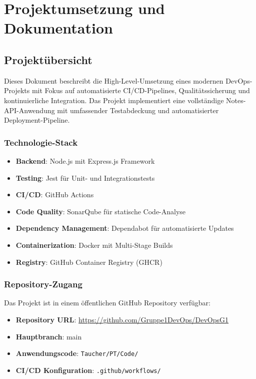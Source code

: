 \section{Projektumsetzung und Dokumentation}

\subsection{Projektübersicht}

Dieses Dokument beschreibt die High-Level-Umsetzung eines modernen DevOps-Projekts mit Fokus auf automatisierte CI/CD-Pipelines, Qualitätssicherung und kontinuierliche Integration. Das Projekt implementiert eine vollständige Notes-API-Anwendung mit umfassender Testabdeckung und automatisierter Deployment-Pipeline.

\subsubsection{Technologie-Stack}
\begin{itemize}
    \item \textbf{Backend}: Node.js mit Express.js Framework
    \item \textbf{Testing}: Jest für Unit- und Integrationstests
    \item \textbf{CI/CD}: GitHub Actions
    \item \textbf{Code Quality}: SonarQube für statische Code-Analyse
    \item \textbf{Dependency Management}: Dependabot für automatisierte Updates
    \item \textbf{Containerization}: Docker mit Multi-Stage Builds
    \item \textbf{Registry}: GitHub Container Registry (GHCR)
\end{itemize}

\subsubsection{Repository-Zugang}
Das Projekt ist in einem öffentlichen GitHub Repository verfügbar:
\begin{itemize}
    \item \textbf{Repository URL}: \url{https://github.com/Gruppe1DevOps/DevOpsG1}
    \item \textbf{Hauptbranch}: main
    \item \textbf{Anwendungscode}: \texttt{Taucher/PT/Code/}
    \item \textbf{CI/CD Konfiguration}: \texttt{.github/workflows/}
\end{itemize}

